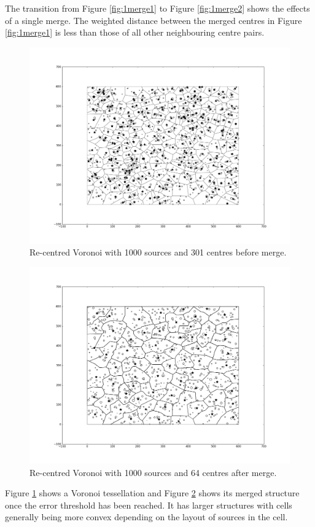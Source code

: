 The transition from Figure \ref{fig:1merge1} to Figure \ref{fig:1merge2} shows the effects of a single merge. The weighted distance between the merged centres in Figure \ref{fig:1merge1} is less than those of all other neighbouring centre pairs.
\begin{figure}[H]
\centering
  \includegraphics[width=\linewidth]{Images/merge1.png}
  \caption{Re-centred Voronoi with 1000 sources and 301 centres before merge.}
  \label{fig:merge1}
\end{figure}
\begin{figure}[H]
\centering
  \includegraphics[width=\linewidth]{Images/merge2.png}
  \caption{Re-centred Voronoi with 1000 sources and 64 centres after merge.}
  \label{fig:merge2}
\end{figure}
Figure \ref{fig:merge1} shows a Voronoi tessellation and Figure \ref{fig:merge2} shows its merged structure once the error threshold has been reached. It has larger structures with cells generally being more convex depending on the layout of sources in the cell.